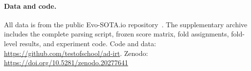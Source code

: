 \documentclass[11pt]{article}
\begin{document}
\paragraph{Data and code.} All data is from the public Evo-SOTA.io repository~\citep{evosota2026}. The supplementary archive includes the complete parsing script, frozen score matrix, fold assignments, fold-level results, and experiment code. Code and data: \url{https://github.com/testofschool/ad-irt}. Zenodo: \url{https://doi.org/10.5281/zenodo.20277641}



\end{document}
